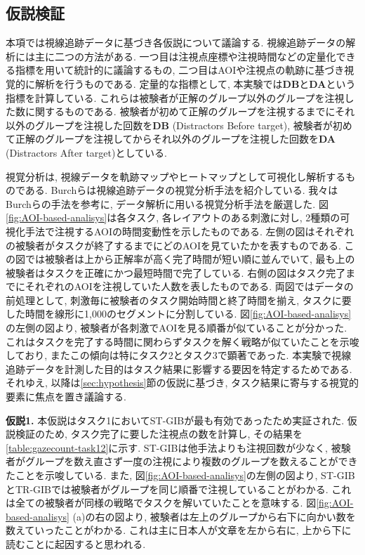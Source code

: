 \documentclass{kuee}
\begin{document}
\subsection{仮説検証}
\label{subsec:eyetrack_result_ex1}
本項では視線追跡データに基づき各仮説について議論する.
視線追跡データの解析には主に二つの方法がある.
一つ目は注視点座標や注視時間などの定量化できる指標を用いて統計的に議論するもの, 二つ目はAOIや注視点の軌跡に基づき視覚的に解析を行うものである.
定量的な指標として, 本実験では{\bf DB}と{\bf DA}という指標を計算している.
これらは被験者が正解のグループ以外のグループを注視した数に関するものである.
被験者が初めて正解のグループを注視するまでにそれ以外のグループを注視した回数を{\bf DB} (Distractors Before target), 被験者が初めて正解のグループを注視してからそれ以外のグループを注視した回数を{\bf DA} (Distractors After target)としている.

視覚分析は, 視線データを軌跡マップやヒートマップとして可視化し解析するものである.
Burchらは視線追跡データの視覚分析手法を紹介している\cite{Burch2013VisualTS}.
我々はBurchらの手法を参考に, データ解析に用いる視覚分析手法を厳選した.
図\ref{fig:AOI-based-analisys}は各タスク, 各レイアウトのある刺激に対し, 2種類の可視化手法で注視するAOIの時間変動性を示したものである.
左側の図はそれぞれの被験者がタスクが終了するまでにどのAOIを見ていたかを表すものである.
この図では被験者は上から正解率が高く完了時間が短い順に並んでいて, 最も上の被験者はタスクを正確にかつ最短時間で完了している.
右側の図はタスク完了までにそれぞれのAOIを注視していた人数を表したものである.
両図ではデータの前処理として, 刺激毎に被験者のタスク開始時間と終了時間を揃え, タスクに要した時間を線形に1,000のセグメントに分割している.
図\ref{fig:AOI-based-analisys}の左側の図より, 被験者が各刺激でAOIを見る順番が似ていることが分かった.
これはタスクを完了する時間に関わらずタスクを解く戦略が似ていたこと{}を示唆しており, またこの傾向は特にタスク2とタスク3で顕著であった.
本実験で視線追跡データを計測した目的はタスク結果に影響する要因を特定するためである.
それゆえ, 以降は\ref{sec:hypothesis}節の仮説に基づき, タスク結果に寄与する視覚的要素に焦点を置き議論する.

{\bf 仮説1.} 本仮説はタスク1においてST-GIBが最も有効であったため実証された.
仮説検証のため, タスク完了に要した注視点の数を計算し, その結果を\ref{table:gazecount-task12}に示す.
ST-GIBは他手法よりも注視回数が少なく, 被験者がグループを数え直さず一度の注視により複数のグループを数えることができたことを示唆している.
また, 図\ref{fig:AOI-based-analisys}の左側の図より, ST-GIBとTR-GIBでは被験者がグループを同じ順番で注視していることがわかる.
これは全ての被験者が同様の戦略でタスクを解いていたことを意味する.
図\ref{fig:AOI-based-analisys} (a)の右の図より, 被験者は左上のグループから右下に向かい数を数えていったことがわかる.
これは主に日本人が文章を左から右に, 上から下に読むことに起因すると思われる.
\end{document}
